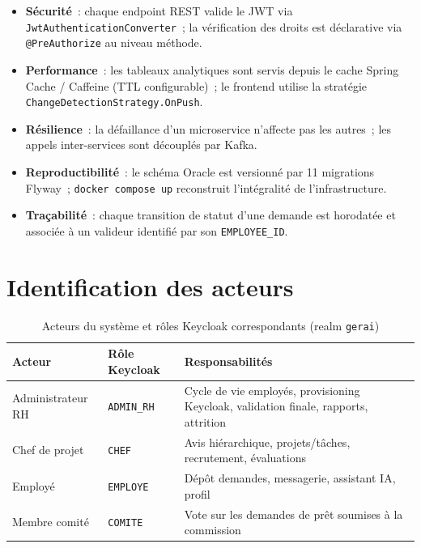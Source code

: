 \begin{itemize}
  \item \textbf{Sécurité}~: chaque endpoint REST valide le JWT via
        \texttt{JwtAuthenticationConverter}~; la vérification des droits est
        déclarative via \texttt{@PreAuthorize} au niveau méthode.
  \item \textbf{Performance}~: les tableaux analytiques sont servis depuis le cache
        Spring Cache / Caffeine (TTL configurable)~; le frontend utilise la stratégie
        \texttt{ChangeDetectionStrategy.OnPush}.
  \item \textbf{Résilience}~: la défaillance d'un microservice n'affecte pas les
        autres~; les appels inter-services sont découplés par Kafka.
  \item \textbf{Reproductibilité}~: le schéma Oracle est versionné par 11 migrations
        Flyway~; \texttt{docker compose up} reconstruit l'intégralité de l'infrastructure.
  \item \textbf{Traçabilité}~: chaque transition de statut d'une demande est
        horodatée et associée à un valideur identifié par son \texttt{EMPLOYEE\_ID}.
\end{itemize}

\section{Identification des acteurs}

\begin{table}[H]
\centering
\caption{Acteurs du système et rôles Keycloak correspondants (realm \texttt{gerai})}
\label{tab:acteurs}
\begin{tabularx}{\textwidth}{|l|l|L|}
\hline
{}\textbf{Acteur} & \textbf{Rôle Keycloak} & \textbf{Responsabilités} \\\hline
{}
Administrateur RH & \texttt{ADMIN\_RH} & Cycle de vie employés, provisioning Keycloak, validation finale, rapports, attrition \\\hline
Chef de projet & \texttt{CHEF} & Avis hiérarchique, projets/tâches, recrutement, évaluations \\\hline
{}
Employé & \texttt{EMPLOYE} & Dépôt demandes, messagerie, assistant IA, profil \\\hline
Membre comité & \texttt{COMITE} & Vote sur les demandes de prêt soumises à la commission \\\hline
\end{tabularx}
\end{table}

